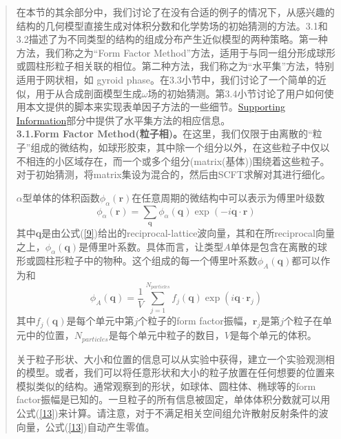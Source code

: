 \documentclass{article}
\begin{document}
\begin{CJK}{UTF8}{gkai}
\begin{quotation}
在本节的其余部分中，我们讨论了在没有合适的例子的情况下，从感兴趣的结构的几何模型直接生成对体积分数和化学势场的初始猜测的方法。3.1和3.2描述了为不同类型的结构的组成分布产生近似模型的两种策略。第一种方法，我们称之为“Form Factor Method”方法，适用于与同一组分形成球形或圆柱形粒子相关联的相位。第二种方法，我们称之为“水平集”方法，特别适用于网状相，如 gyroid phase。在3.3小节中，我们讨论了一个简单的近似，用于从合成剖面模型生成$\omega$场的初始猜测。第3.4小节讨论了用户如何使用本文提供的脚本来实现表单因子方法的一些细节。\href{http://pubs.acs.org/doi/suppl/10.1021/acs.macromol.6b00107/suppl_file/ma6b00107_si_001.pdf}{Supporting Information}部分中提供了水平集方法的相应信息。\\
\textbf{3.1.Form Factor Method(粒子相)。}在这里，我们仅限于由离散的“粒子”组成的微结构，如球形胶束，其中除一个组分以外，在这些粒子中仅以不相连的小区域存在，而一个或多个组分(matrix(基体))围绕着这些粒子。对于初始猜测，将matrix集设为混合的，然后由SCFT求解对其进行细化。

$\alpha$型单体的体积函数$\phi _{\alpha}(\mathbf{r})$在任意周期的微结构中可以表示为傅里叶级数
\begin{equation}\label{12}
\phi _{\alpha}(\mathbf{r})=\sum _{\mathbf{q}}\phi _{\alpha}(\mathbf{q})\exp (-i \mathbf{q} \cdot \mathbf{r})
\end{equation}
其中$\mathbf{q}$是由公式(\ref{9})给出的reciprocal-lattice波向量，其和在所reciprocal向量之上，$\phi _{\alpha}(\mathbf{q})$是傅里叶系数。具体而言，让类型$A$单体是包含在离散的球形或圆柱形粒子中的物种。这个组成的每一个傅里叶系数$\phi _{A}(\mathbf{q})$都可以作为和
\begin{equation}\label{13}
\phi _{A}(\mathbf{q})=\frac{1}{V}\sum _{j=1}^{N_{particles}} f_{j}(\mathbf{q})\exp (i \mathbf{q} \cdot \mathbf{r}_j)
\end{equation}
其中$f_{j}(\mathbf{q})$是每个单元中第$j$个粒子的form factor振幅，$\mathbf{r}_j$是第$j$个粒子在单元中的位置，$N_{particles}$是每个单元中粒子的数目，$V$是每个单元的体积。

关于粒子形状、大小和位置的信息可以从实验中获得，建立一个实验观测相的模型。或者，我们可以将任意形状和大小的粒子放置在任何想要的位置来模拟类似的结构。通常观察到的形状，如球体、圆柱体、椭球等的form factor振幅是已知的。一旦粒子的所有信息被固定，单体体积分数就可以用公式(\ref{13})来计算。请注意，对于不满足相关空间组允许散射反射条件的波向量，公式(\ref{13})自动产生零值。


\end{quotation}
\end{CJK}
\end{document}
